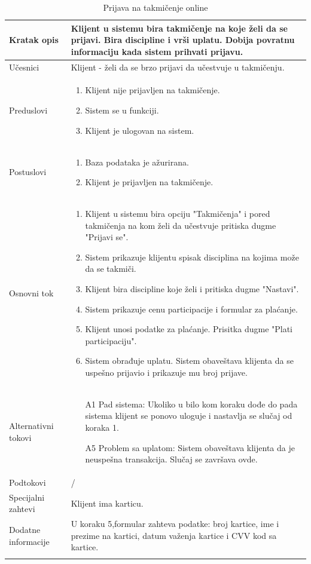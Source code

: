\documentclass[../../main.tex]{subfiles}
\begin{document}
\begin{longtable}{| p{} | p{} |} 
\hline
    Kratak opis & Klijent u sistemu bira takmičenje na koje želi da se prijavi. Bira discipline i vrši uplatu. Dobija povratnu informaciju kada sistem prihvati prijavu. \\ 
\hline    
    Učesnici & Klijent - želi da se brzo prijavi da učestvuje u takmičenju.\\
\hline
   Preduslovi & \begin{enumerate}
       \item Klijent nije prijavljen na takmičenje.
       \item Sistem se u funkciji.
       \item Klijent je ulogovan na sistem.
   \end{enumerate}\\
\hline  
    Postuslovi & \begin{enumerate}
        \item Baza podataka je ažurirana.
        \item Klijent je prijavljen na takmičenje.
    \end{enumerate}\\
\hline
    Osnovni tok & \begin{enumerate}
        \item Klijent u sistemu bira opciju "Takmičenja"  i pored takmičenja na kom želi da učestvuje pritiska dugme "Prijavi se".
        \item Sistem prikazuje klijentu spisak disciplina na kojima može da se takmiči.
        \item Klijent bira discipline koje želi i pritiska dugme "Nastavi".
        \item Sistem prikazuje cenu participacije i formular za plaćanje.
        \item Klijent unosi podatke za plaćanje. Prisitka dugme "Plati participaciju".
        \item Sistem obrađuje uplatu. Sistem obaveštava klijenta da se uspešno prijavio i prikazuje mu broj prijave.
    \end{enumerate}\\
\hline
    Alternativni tokovi & \begin{itemize}
        \item[A1] Pad sistema: Ukoliko u bilo kom koraku dođe do pada sistema klijent se ponovo uloguje i nastavlja se slučaj od koraka 1.
        \item[A5] Problem sa uplatom: Sistem obaveštava klijenta da je neuspešna transakcija. Slučaj se završava ovde. 
    \end{itemize}\\
\hline
    Podtokovi & /\\
\hline
    Specijalni zahtevi & Klijent ima karticu.\\
\hline
    Dodatne informacije & U koraku 5,formular zahteva podatke: broj kartice, ime i prezime na kartici, datum važenja kartice i CVV kod sa kartice.\\
\hline
\caption{Prijava na takmičenje online} %
\end{longtable}
\end{document}
